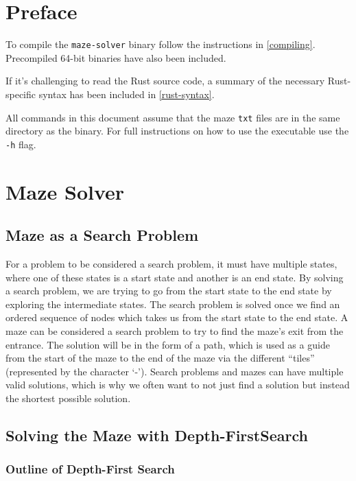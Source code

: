 \documentclass[11pt]{article}
\newcommand{\ssl}[1]{\texttt{#1}}
\begin{document}
\section*{Preface}

To compile the \ssl{maze-solver} binary follow the instructions in
\autoref{compiling}. Precompiled 64-bit binaries have also been included.

If it's challenging to read the Rust source code, a
summary of the necessary Rust-specific syntax has been included in
\autoref{rust-syntax}.

All commands in this document assume that the maze \ssl{txt} files
are in the same directory as the binary. For full instructions on how to use the executable use the \ssl{-h} flag.

\section{Maze Solver}\label{maze-solver}

\subsection{Maze as a Search Problem}\label{maze-as-a-search-problem}

For a problem to be considered a search problem, it must have multiple
states, where one of these states is a start state and another is an end
state. By solving a search problem, we are trying to go from the start
state to the end state by exploring the intermediate states. The search
problem is solved once we find an ordered sequence of nodes which takes
us from the start state to the end state. A maze can be considered a
search problem to try to find the maze's exit from the
entrance. The solution will be in the form of a path, which is used as a
guide from the start of the maze to the end of the maze via the
different ``tiles'' (represented by the character
`-'). Search problems and mazes can have
multiple valid solutions, which is why we often want to not just find a
solution but instead the shortest possible solution.

\subsection{Solving the Maze with Depth-FirstSearch}
\label{solving-the-maze-with-depth-first-search}

\subsubsection{Outline of Depth-First Search}
\label{outline-of-depth-first-search}
\end{document}
